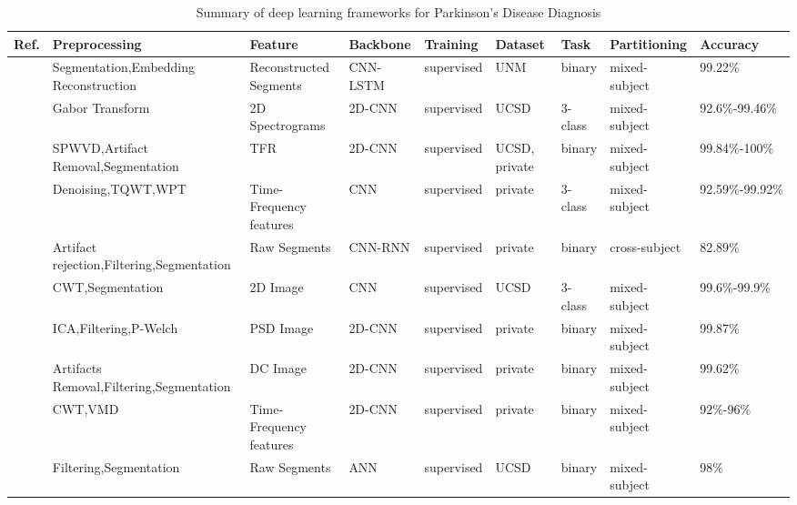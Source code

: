 \begin{table*}[ht]
\renewcommand{\arraystretch}{1.2}
\caption{Summary of deep learning frameworks for Parkinson's Disease Diagnosis}
\label{tab:pds}
\footnotesize
\begin{tabular}{p{0.4cm}p{2.8cm}p{2cm}p{1.5cm}p{1.9cm}p{1.9cm}p{0.8cm}p{1.8cm}p{2cm}}
\hline
\textbf{Ref.} & \textbf{Preprocessing} & \textbf{Feature} & \textbf{Backbone} & \textbf{Training} & \textbf{Dataset} & \textbf{Task} & \textbf{Partitioning} & \textbf{Accuracy} \\
\hline
~\cite{PD1} & Segmentation,Embedding Reconstruction & Reconstructed Segments & CNN-LSTM & supervised & UNM & binary & mixed-subject & 99.22\% \\
~\cite{PD2} & Gabor Transform & 2D Spectrograms & 2D-CNN & supervised & UCSD & 3-class & mixed-subject & 92.6\%-99.46\% \\
~\cite{PD3} & SPWVD,Artifact Removal,Segmentation & TFR & 2D-CNN & supervised & UCSD, \newline private & binary & mixed-subject & 99.84\%-100\% \\
~\cite{PD5} & Denoising,TQWT,WPT & Time-Frequency features & CNN & supervised & private & 3-class & mixed-subject & 92.59\%-99.92\% \\
~\cite{PD6} & Artifact rejection,\newline Filtering,Segmentation & Raw Segments & CNN-RNN & supervised & private & binary & cross-subject & 82.89\% \\
~\cite{shaban2022resting} & CWT,Segmentation & 2D Image & CNN & supervised & UCSD & 3-class & mixed-subject & 99.6\%-99.9\% \\
~\cite{PD8} & ICA,Filtering,P-Welch & PSD Image & 2D-CNN & supervised & private & binary & mixed-subject & 99.87\% \\
~\cite{PD9} & Artifacts Removal,\newline Filtering,Segmentation & DC Image & 2D-CNN & supervised & private & binary & mixed-subject & 99.62\% \\
~\cite{PD11} & CWT,VMD & Time-Frequency features & 2D-CNN & supervised & private & binary & mixed-subject & 92\%-96\% \\
~\cite{PD12} & Filtering,Segmentation & Raw Segments & ANN & supervised & UCSD & binary & mixed-subject & 98\% \\

\end{tabular}
\end{table*}
